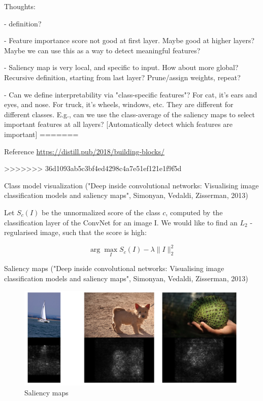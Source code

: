 \documentclass[english]{article}
\begin{document}
\item Thoughts: 

- definition?

- Feature importance score not good at first layer. Maybe good at higher layers? Maybe we can use this as a way to detect meaningful features?

- Saliency map is very local, and specific to input. How about more global? Recursive definition, starting from last layer? Prune/assign weights, repeat?

- Can we define interpretability via "class-specific features"? For cat, it's ears and eyes, and nose. For truck, it's wheels, windows, etc. They are different for different classes. E.g., can we use the class-average of the saliency maps to select important features at all layers? [Automatically detect which features are important]
=======

\item Reference \url{https://distill.pub/2018/building-blocks/}

>>>>>>> 36d1093ab5c3bf4ed4298c4a7e51ef121e1f9f5d

\item Class model visualization ("Deep inside convolutional networks: Visualising image classification models and saliency maps", Simonyan, Vedaldi, Zisserman, 2013)

Let $S_c(I)$ be the unnormalized score of the class $c$, computed by the classification layer of the ConvNet for an image I. We would like to find an $L_2$  - regularised image, such that the score is
high:

$$\arg\max_I
S_c(I) - \lambda \|I\|_2^2 
$$

\item  Saliency maps ("Deep inside convolutional networks: Visualising image classification models and saliency maps", Simonyan, Vedaldi, Zisserman, 2013)


\begin{figure}
  \centering
  \includegraphics[width=\textwidth]{saliency.png}
  \caption{Saliency maps}
  \label{saliency}
\end{figure}
\end{document}
